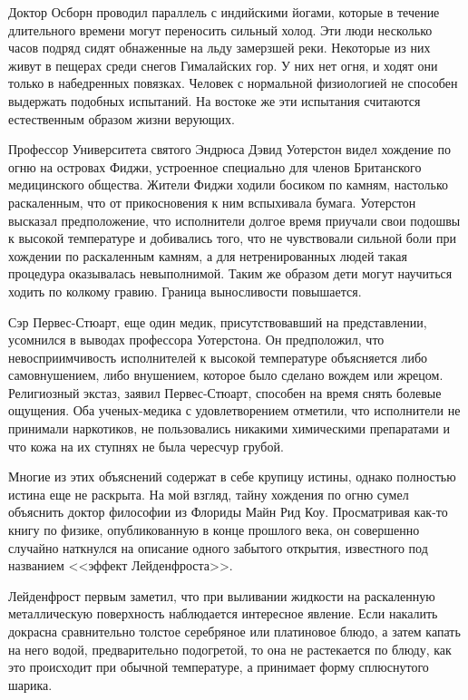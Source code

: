 \documentclass[12pt,a4paper,twoside,openany,svgnames]{memoir}
\begin{document}
Доктор Осборн проводил параллель с индийскими йогами, которые в течение длительного времени могут переносить сильный холод. Эти люди несколько часов подряд сидят обнаженные на льду замерзшей реки. Некоторые из них живут в пещерах среди снегов Гималайских гор. У них нет огня, и ходят они только в набедренных повязках. Человек с нормальной физиологией не способен выдержать подобных испытаний. На востоке же эти испытания считаются естественным образом жизни верующих.

Профессор Университета святого Эндрюса Дэвид Уотерстон видел хождение по огню на островах Фиджи, устроенное специально для членов Британского медицинского общества. Жители Фиджи ходили босиком по камням, настолько раскаленным, что от прикосновения к ним вспыхивала бумага. Уотерстон высказал предположение, что исполнители долгое время приучали свои подошвы к высокой температуре и добивались того, что не чувствовали сильной боли при хождении по раскаленным камням, а для нетренированных людей такая процедура оказывалась невыполнимой. Таким же образом дети могут научиться ходить по колкому гравию. Граница выносливости повышается.

Сэр Первес-Стюарт, еще один медик, присутствовавший на представлении, усомнился в выводах профессора Уотерстона. Он предположил, что невосприимчивость исполнителей к высокой температуре объясняется либо самовнушением, либо внушением, которое было сделано вождем или жрецом. Религиозный экстаз, заявил Первес-Стюарт, способен на время снять болевые ощущения. Оба ученых-медика с удовлетворением отметили, что исполнители не принимали наркотиков, не пользовались никакими химическими препаратами и что кожа на их ступнях не была чересчур грубой.

Многие из этих объяснений содержат в себе крупицу истины, однако полностью истина еще не раскрыта. На мой взгляд, тайну хождения по огню сумел объяснить доктор философии из Флориды Майн Рид Коу. Просматривая как-то книгу по физике, опубликованную в конце прошлого века, он совершенно случайно наткнулся на описание одного забытого открытия, известного под названием <<эффект Лейденфроста>>.

Лейденфрост первым заметил, что при выливании жидкости на раскаленную металлическую поверхность наблюдается интересное явление. Если накалить докрасна сравнительно толстое серебряное или платиновое блюдо, а затем капать на него водой, предварительно подогретой, то она не растекается по блюду, как это происходит при обычной температуре, а принимает форму сплюснутого шарика.
\end{document}
